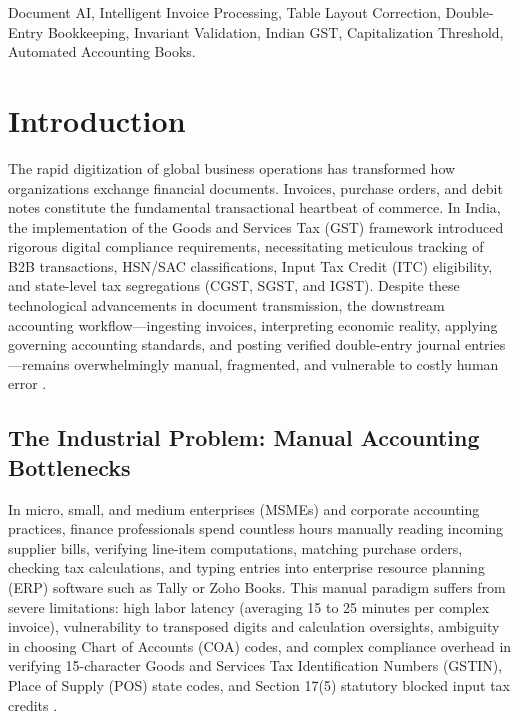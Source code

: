 \documentclass[conference]{IEEEtran}
\begin{document}
\begin{IEEEkeywords}
Document AI, Intelligent Invoice Processing, Table Layout Correction, Double-Entry Bookkeeping, Invariant Validation, Indian GST, Capitalization Threshold, Automated Accounting Books.
\end{IEEEkeywords}

\section{Introduction}
The rapid digitization of global business operations has transformed how organizations exchange financial documents. Invoices, purchase orders, and debit notes constitute the fundamental transactional heartbeat of commerce. In India, the implementation of the Goods and Services Tax (GST) framework introduced rigorous digital compliance requirements, necessitating meticulous tracking of B2B transactions, HSN/SAC classifications, Input Tax Credit (ITC) eligibility, and state-level tax segregations (CGST, SGST, and IGST). Despite these technological advancements in document transmission, the downstream accounting workflow---ingesting invoices, interpreting economic reality, applying governing accounting standards, and posting verified double-entry journal entries---remains overwhelmingly manual, fragmented, and vulnerable to costly human error \cite{rose2020zero}.

\subsection{The Industrial Problem: Manual Accounting Bottlenecks}
In micro, small, and medium enterprises (MSMEs) and corporate accounting practices, finance professionals spend countless hours manually reading incoming supplier bills, verifying line-item computations, matching purchase orders, checking tax calculations, and typing entries into enterprise resource planning (ERP) software such as Tally or Zoho Books. This manual paradigm suffers from severe limitations: high labor latency (averaging 15 to 25 minutes per complex invoice), vulnerability to transposed digits and calculation oversights, ambiguity in choosing Chart of Accounts (COA) codes, and complex compliance overhead in verifying 15-character Goods and Services Tax Identification Numbers (GSTIN), Place of Supply (POS) state codes, and Section 17(5) statutory blocked input tax credits \cite{rana2025template}.
\end{document}
